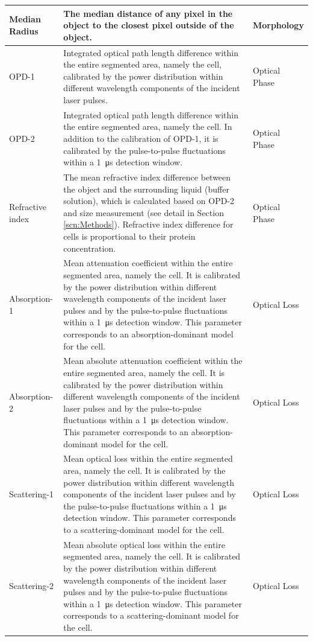\documentclass[aps,pra,reprint,superscriptaddress]{revtex4-1}
\begin{document}
\begin{table}
\begin{tabular}{|p{}|p{}|p{}|}
Median Radius	 &The median distance of any pixel in the object to the closest pixel outside of the object.	 &Morphology\\ \hline
OPD-1	 &Integrated optical path length difference within the entire segmented area, namely the cell, calibrated by the power distribution within different wavelength components of the incident laser pulses.	 &Optical Phase\\ \hline
OPD-2	 &Integrated optical path length difference within the entire segmented area, namely the cell. In addition to the calibration of OPD-1, it is calibrated by the pulse-to-pulse fluctuations within a \SI{1}{\micro\second} detection window.	 &Optical Phase\\ \hline
Refractive index	 &The mean refractive index difference between the object and the surrounding liquid (buffer solution), which is calculated based on OPD-2 and size measurement (see detail in Section \ref{scn:Methods}). Refractive index difference for cells is proportional to their protein concentration.	 &Optical Phase\\ \hline
Absorption-1	 &Mean attenuation coefficient within the entire segmented area, namely the cell. It is calibrated by the power distribution within different wavelength components of the incident laser pulses and by the pulse-to-pulse fluctuations within a \SI{1}{\micro\second} detection window. This parameter corresponds to an absorption-dominant model for the cell.	 &Optical Loss\\ \hline
Absorption-2	 &Mean absolute attenuation coefficient within the entire segmented area, namely the cell. It is calibrated by the power distribution within different wavelength components of the incident laser pulses and by the pulse-to-pulse fluctuations within a \SI{1}{\micro\second} detection window. This parameter corresponds to an absorption-dominant model for the cell.	 &Optical Loss\\ \hline
Scattering-1	 &Mean optical loss within the entire segmented area, namely the cell. It is calibrated by the power distribution within different wavelength components of the incident laser pulses and by the pulse-to-pulse fluctuations within a \SI{1}{\micro\second} detection window. This parameter corresponds to a scattering-dominant model for the cell.	 &Optical Loss\\ \hline
Scattering-2	 &Mean absolute optical loss within the entire segmented area, namely the cell. It is calibrated by the power distribution within different wavelength components of the incident laser pulses and by the pulse-to-pulse fluctuations within a \SI{1}{\micro\second} detection window. This parameter corresponds to a scattering-dominant model for the cell.	 &Optical Loss\\
\hline
\end{tabular}
\end{table}
\end{document}
